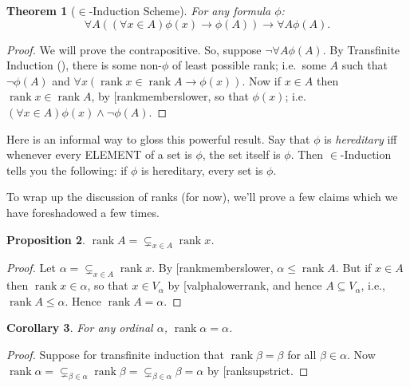 \documentclass[10pt,a4paper]{article}
\makeatletter
\newcommand*{\olup}[1]{\MakeUppercase{#1}}
\theoremstyle{plain}
\newtheorem{thm}{Theorem}[section]
\newtheorem{prop}[thm]{Proposition}
\newtheorem{cor}[thm]{Corollary}
\theoremstyle{definition}
\theoremstyle{remark}
\newcommand*{\ollabel}[1]{\label{#1}}
\newcommand{\olref}{\@ifnextchar[{\olref@i}{\olref@final}}
\def\olref@i[#1]{\@ifnextchar[{\olref@ii}{\olref@final}}
\def\olref@ii[#1]{\@ifnextchar[{\olref@iii}{\olref@final}}
\def\olref@iii[#1]{\olref@final}
\def\olref@final#1{\ref{#1}}
\providecommand{\lif}{\mathbin{\rightarrow}}
\providecommand{\Setabs}[2]{\{\, #1 \mid #2 \,\}}
\providecommand{\supstrict}{\subsetneq}
\providecommand{\setrank}{\operatorname{rank}}
\makeatother
\begin{document}
\begin{thm}[$\in$-Induction Scheme] 
For any formula $\phi$:
\[
	\forall A((\forall x \in A)\phi(x) \lif \phi(A)) \lif \forall A \phi(A).
\]
\end{thm}

\begin{proof}
We will prove the contrapositive. So, suppose $\lnot \forall A
\phi(A)$. By Transfinite Induction
(\olref[ordinals][basic]{ordinductionschema}), there
is some non-$\phi$ of least possible rank; i.e.\ some $A$
such that $\lnot \phi(A)$ and $\forall x(\setrank{x} \in \setrank{A}
\lif \phi(x))$. Now if $x \in A$ then $\setrank{x} \in
\setrank{A}$, by \olref{rankmemberslower}, so that $\phi(x)$; i.e.\ $(\forall x \in
A)\phi(x) \land \lnot \phi(A)$.
\end{proof}\noindent Here is an informal way to gloss this powerful
result. Say that $\phi$ is \emph{hereditary} iff whenever every
\olup{element} of a set is $\phi$, the set itself is $\phi$. Then
$\in$-Induction tells you the following: if $\phi$ is hereditary,
every set is $\phi$.

To wrap up the discussion of ranks (for now), we'll prove a few
claims which we have foreshadowed a few times. 

\begin{prop}\ollabel{ranksupstrict}
$\setrank{A} = \supstrict_{x \in A}\setrank{x}$.
\end{prop}

\begin{proof}
Let $\alpha = \supstrict_{x \in A}\setrank{x}$. By
\olref{rankmemberslower}, $\alpha \leq \setrank{A}$. But if $x \in A$
then $\setrank{x} \in \alpha$, so that $x \in V_\alpha$ by \olref{valphalowerrank}, and hence $A
\subseteq V_\alpha$, i.e., $\setrank{A} \leq \alpha$. Hence
$\setrank{A} = \alpha$.
\end{proof}

\begin{cor}\ollabel{ordsetrankalpha}
For any ordinal $\alpha$, $\setrank{\alpha} = \alpha$.
\end{cor}

\begin{proof}
Suppose for transfinite induction that $\setrank{\beta} = \beta$ for
all $\beta \in \alpha$. Now $\setrank{\alpha} = \supstrict_{\beta \in
\alpha}\setrank{\beta} = \supstrict_{\beta \in \alpha}\beta = \alpha$
by \olref{ranksupstrict}.
%
\end{proof}
\end{document}
